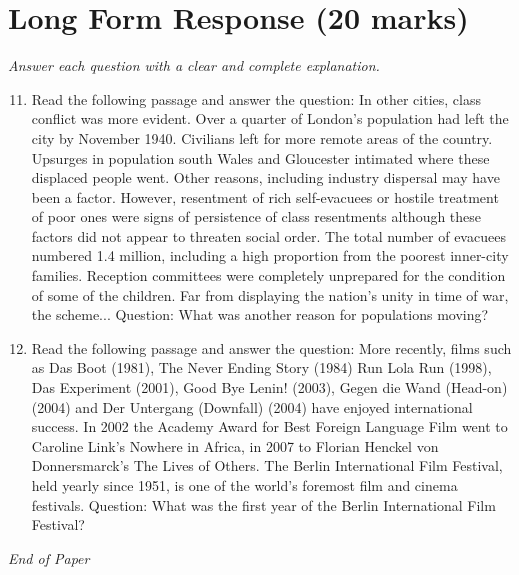 \documentclass[12pt]{article}
\begin{document}
\section*{Long Form Response (20 marks)}
\textit{Answer each question with a clear and complete explanation.}
\begin{enumerate}[label=\arabic*.]
\setcounter{enumi}{10}
\item Read the following passage and answer the question: In other cities, class conflict was more evident. Over a quarter of London's population had left the city by November 1940. Civilians left for more remote areas of the country. Upsurges in population south Wales and Gloucester intimated where these displaced people went. Other reasons, including industry dispersal may have been a factor. However, resentment of rich self-evacuees or hostile treatment of poor ones were signs of persistence of class resentments although these factors did not appear to threaten social order. The total number of evacuees numbered 1.4 million, including a high proportion from the poorest inner-city families. Reception committees were completely unprepared for the condition of some of the children. Far from displaying the nation's unity in time of war, the scheme... Question: What was another reason for populations moving?
\item Read the following passage and answer the question: More recently, films such as Das Boot (1981), The Never Ending Story (1984) Run Lola Run (1998), Das Experiment (2001), Good Bye Lenin! (2003), Gegen die Wand (Head-on) (2004) and Der Untergang (Downfall) (2004) have enjoyed international success. In 2002 the Academy Award for Best Foreign Language Film went to Caroline Link's Nowhere in Africa, in 2007 to Florian Henckel von Donnersmarck's The Lives of Others. The Berlin International Film Festival, held yearly since 1951, is one of the world's foremost film and cinema festivals. Question: What was the first year of the Berlin International Film Festival?
\end{enumerate}

\vfill
\noindent\textit{End of Paper}
\end{document}

